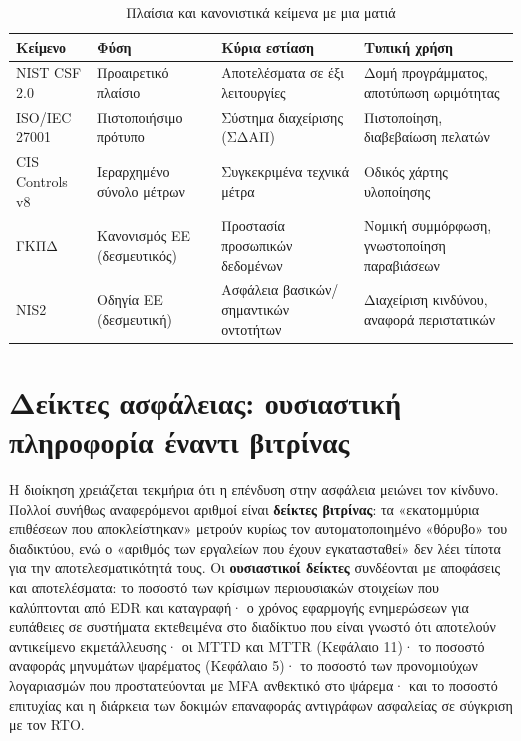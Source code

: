\documentclass[11pt,openany]{book}
\begin{document}
\begin{table}[htbp]
  \centering\small
  \caption{Πλαίσια και κανονιστικά κείμενα με μια ματιά}
  \begin{tabularx}{\linewidth}{>{\raggedright\arraybackslash}X >{\raggedright\arraybackslash}X >{\raggedright\arraybackslash}X >{\raggedright\arraybackslash}X}
    \toprule
    \textbf{Κείμενο} & \textbf{Φύση} & \textbf{Κύρια εστίαση} & \textbf{Τυπική χρήση} \\
    \midrule
    NIST CSF 2.0 & Προαιρετικό πλαίσιο & Αποτελέσματα σε έξι λειτουργίες & Δομή προγράμματος, αποτύπωση ωριμότητας \\
    ISO/IEC 27001 & Πιστοποιήσιμο πρότυπο & Σύστημα διαχείρισης (ΣΔΑΠ) & Πιστοποίηση, διαβεβαίωση πελατών \\
    CIS Controls v8 & Ιεραρχημένο σύνολο μέτρων & Συγκεκριμένα τεχνικά μέτρα & Οδικός χάρτης υλοποίησης \\
    ΓΚΠΔ & Κανονισμός ΕΕ (δεσμευτικός) & Προστασία προσωπικών δεδομένων & Νομική συμμόρφωση, γνωστοποίηση παραβιάσεων \\
    NIS2 & Οδηγία ΕΕ (δεσμευτική) & Ασφάλεια βασικών/σημαντικών οντοτήτων & Διαχείριση κινδύνου, αναφορά περιστατικών \\
    \bottomrule
  \end{tabularx}
\end{table}
\section{Δείκτες ασφάλειας: ουσιαστική πληροφορία έναντι βιτρίνας}\label{sec:13.5}
Η διοίκηση χρειάζεται τεκμήρια ότι η επένδυση στην ασφάλεια μειώνει τον κίνδυνο. Πολλοί συνήθως αναφερόμενοι αριθμοί είναι \textbf{δείκτες βιτρίνας}: τα «εκατομμύρια επιθέσεων που αποκλείστηκαν» μετρούν κυρίως τον αυτοματοποιημένο «θόρυβο» του διαδικτύου, ενώ ο «αριθμός των εργαλείων που έχουν εγκατασταθεί» δεν λέει τίποτα για την αποτελεσματικότητά τους. Οι \textbf{ουσιαστικοί δείκτες} συνδέονται με αποφάσεις και αποτελέσματα: το ποσοστό των κρίσιμων περιουσιακών στοιχείων που καλύπτονται από EDR και καταγραφή· ο χρόνος εφαρμογής ενημερώσεων για ευπάθειες σε συστήματα εκτεθειμένα στο διαδίκτυο που είναι γνωστό ότι αποτελούν αντικείμενο εκμετάλλευσης· οι MTTD και MTTR (Κεφάλαιο 11)· το ποσοστό αναφοράς μηνυμάτων ψαρέματος (Κεφάλαιο 5)· το ποσοστό των προνομιούχων λογαριασμών που προστατεύονται με MFA ανθεκτικό στο ψάρεμα· και το ποσοστό επιτυχίας και η διάρκεια των δοκιμών επαναφοράς αντιγράφων ασφαλείας σε σύγκριση με τον RTO.
\end{document}
